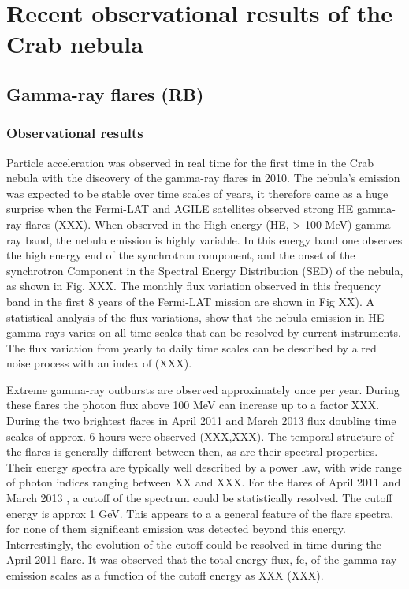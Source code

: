 \section{Recent observational results of the Crab nebula}
\subsection{Gamma-ray flares (RB)}
\subsubsection{Observational results}
Particle acceleration was observed in real time for the first time in the Crab nebula with the discovery of the gamma-ray flares in 2010.  The nebula's emission was expected to  be stable over time scales of years, it therefore came as a huge surprise when the Fermi-LAT and AGILE satellites observed strong HE gamma-ray flares (XXX). When observed in the High energy (HE, > 100 MeV) gamma-ray band, the nebula emission is highly variable. In this energy band one observes the high energy end of the synchrotron component, and the onset of the synchrotron Component in the Spectral Energy Distribution (SED) of the nebula, as shown in Fig. XXX. The monthly flux variation observed in this frequency band in the first 8 years of the Fermi-LAT mission are shown in Fig XX). A statistical analysis of the flux variations, show that the nebula emission in HE gamma-rays varies on all time scales that can be resolved by current instruments. The flux variation from yearly to daily time scales can be described by a red noise process with an index of (XXX).

Extreme gamma-ray outbursts are observed approximately once per year. During these flares the photon flux above 100 MeV can increase up to a factor XXX. During the two brightest flares in April 2011 and March 2013 flux doubling time scales of approx. 6 hours were observed (XXX,XXX). The temporal structure of the flares is generally different between then, as are their spectral properties. Their energy spectra are typically well described by a power law, with  wide range of photon indices ranging between  XX and XXX. For the flares of April 2011 and March 2013 , a cutoff of the spectrum could be statistically resolved. The cutoff energy is approx 1 GeV. This appears to a a general feature of the flare spectra, for none of them significant emission was detected beyond this energy. Interrestingly, the evolution of the cutoff could be resolved in time during the April 2011 flare. It was observed that the total energy flux, fe, of the gamma ray emission scales as a function of the cutoff energy as XXX (XXX).

